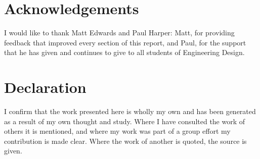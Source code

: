 \documentclass[11pt,a4paper,article]{memoir} %
\begin{document}
\newpage
\chapter*{\large Acknowledgements}
\vspace*{-2\baselineskip}
I would like to thank Matt Edwards and Paul Harper: Matt, for providing feedback that improved every section of this report, and Paul, for the support that he has given and continues to give to all students of Engineering Design.\\


\chapter*{\large Declaration}
\vspace*{-2\baselineskip}
I confirm that the work presented here is wholly my own and has been generated as a result of my own thought and study. Where I have consulted the work of others it is mentioned, and where my work was part of a group effort my contribution is made clear. Where the work of another is quoted, the source is given.

\newpage
\end{document}

